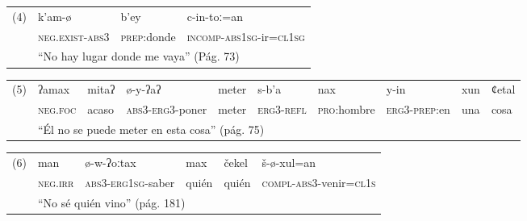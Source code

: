 {      %
      \noindent \begin{tabular}{llll}
            (4) & k'am-ø                                                     & b'ey                & c-in-toː=an                            \\
                & \textsc{neg.exist-abs3}                                    & \textsc{prep}:donde & \textsc{incomp-abs1sg}-ir=\textsc{cl1sg} \\
                & \multicolumn{3}{l}{“No hay lugar donde me vaya” (Pág. 73)}                                                                \\
      \end{tabular} \vspace{0.25cm}

      \noindent \begin{tabular}{llllllllll}
            (5) & ʔamax                                                             & mitaʔ & ø-y-ʔaʔ                & meter & s-b'a            & nax                 & y-in                & xun & ȼetal \\
                & \textsc{neg.foc}                                                  & acaso & \textsc{abs3-erg3}-poner & meter & \textsc{erg3-refl} & \textsc{pro}:hombre & \textsc{erg3-prep}:en & una & cosa  \\
                & \multicolumn{9}{l}{“Él no se puede meter en esta cosa” (pág. 75)}                                                                                                                       \\
      \end{tabular} \vspace{0.25cm}

      \noindent \begin{tabular}{llllll}
            (6) & man                                               & ø-w-ʔoːtax              & max   & čekel & š-ø-xul=an                              \\
                & \textsc{neg.irr}                                  & \textsc{abs3-erg1sg}-saber & quién & quién & \textsc{compl-abs3}-venir=\textsc{cl1s} \\
                & \multicolumn{5}{l}{“No sé quién vino” (pág. 181)}                                                                                     \\
      \end{tabular} \vspace{0.25cm}

}
